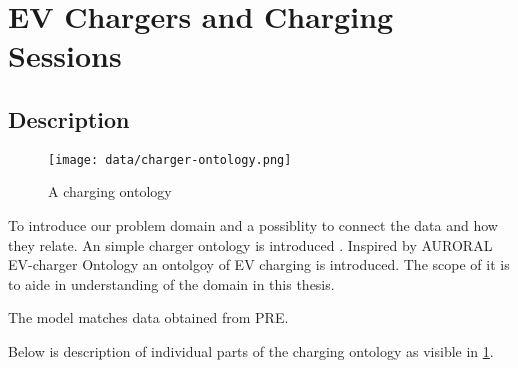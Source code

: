 \section{EV Chargers and Charging Sessions}

\subsection{Description}

\begin{figure}
    \texttt{[image: data/charger-ontology.png]}
    \caption{A charging ontology}
    \label{fig:charging-ontology}
\end{figure}


To introduce our problem domain and a possiblity to connect the data and how they relate. An simple charger ontology is introduced . Inspired by AURORAL EV-charger Ontology  an ontolgoy of EV charging is introduced. The scope of it is to aide in understanding of the domain in this thesis.

The model matches data obtained from PRE.

Below is description of individual parts of the charging ontology as visible in \ref{fig:charging-ontology}.

